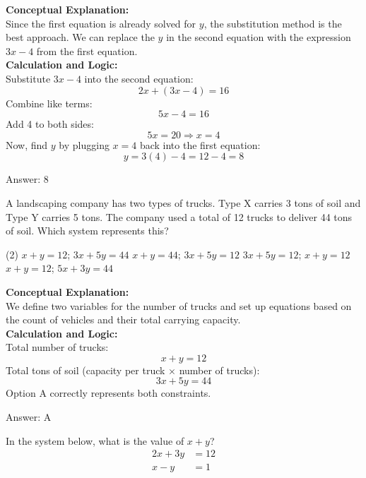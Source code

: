 \documentclass[11pt,paper=a4,answers]{exam}
\begin{document}
\begin{questions}
\begin{solution}
\textbf{Conceptual Explanation:} \\
Since the first equation is already solved for $y$, the substitution method is the best approach. We can replace the $y$ in the second equation with the expression $3x - 4$ from the first equation.
\\[10pt]
\textbf{Calculation and Logic:} \\
Substitute $3x - 4$ into the second equation:
\[2x + (3x - 4) = 16\]
Combine like terms:
\[5x - 4 = 16\]
Add 4 to both sides:
\[5x = 20 \Rightarrow x = 4\]
Now, find $y$ by plugging $x = 4$ back into the first equation:
\[y = 3(4) - 4 = 12 - 4 = 8\]

\vspace{15pt}
Answer: \colorbox{yellow!100}{8}
\end{solution}

\question
A landscaping company has two types of trucks. Type X carries 3 tons of soil and Type Y carries 5 tons. The company used a total of 12 trucks to deliver 44 tons of soil. Which system represents this?
\begin{tasks}(2)
    \task $x + y = 12$; $3x + 5y = 44$
    \task $x + y = 44$; $3x + 5y = 12$
    \task $3x + 5y = 12$; $x + y = 12$
    \task $x + y = 12$; $5x + 3y = 44$
\end{tasks}

\begin{solution}
\textbf{Conceptual Explanation:} \\
We define two variables for the number of trucks and set up equations based on the count of vehicles and their total carrying capacity.
\\[10pt]
\textbf{Calculation and Logic:} \\
Total number of trucks:
\[x + y = 12\]
Total tons of soil (capacity per truck $\times$ number of trucks):
\[3x + 5y = 44\]
Option A correctly represents both constraints.

\vspace{15pt}
Answer: \colorbox{yellow!100}{A}
\end{solution}

\question
In the system below, what is the value of $x + y$?
\begin{align*}
2x + 3y &= 12 \\
x - y &= 1
\end{align*}


\end{questions}
\end{document}
